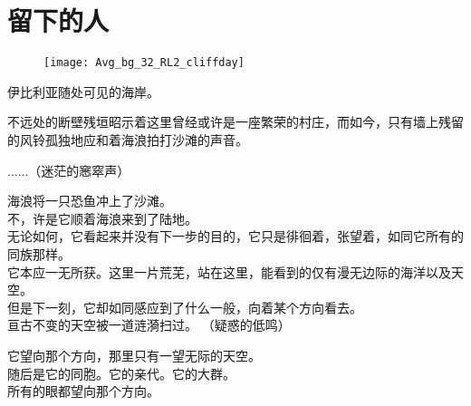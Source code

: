 \documentclass[openany]{book}
\begin{document}
\chapter{留下的人}
\begin{figure}[h]
    \centering
    \texttt{[image: Avg\_bg\_32\_RL2\_cliffday]}
\end{figure}
伊比利亚随处可见的海岸。\par
不远处的断壁残垣昭示着这里曾经或许是一座繁荣的村庄，而如今，只有墙上残留的风铃孤独地应和着海浪拍打沙滩的声音。

\begin{dialogue}
     ......（迷茫的窸窣声）\par
    海浪将一只恐鱼冲上了沙滩。\\
    不，许是它顺着海浪来到了陆地。\\
    无论如何，它看起来并没有下一步的目的，它只是徘徊着，张望着，如同它所有的同族那样。\\
    它本应一无所获。这里一片荒芜，站在这里，能看到的仅有漫无边际的海洋以及天空。\\
    但是下一刻，它却如同感应到了什么一般，向着某个方向看去。\\
    亘古不变的天空被一道涟漪扫过。
     （疑惑的低鸣）\par
    它望向那个方向，那里只有一望无际的天空。\\
    随后是它的同胞。它的亲代。它的大群。\\
    所有的眼都望向那个方向。
\end{dialogue}\par
\end{document}
